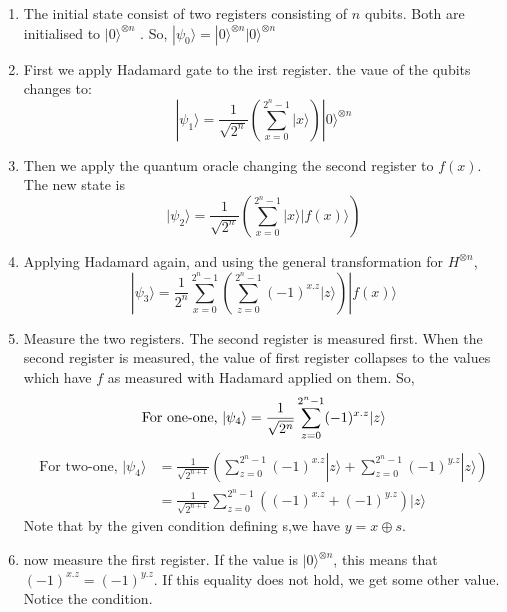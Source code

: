 \begin{enumerate}
\item The initial state consist of two registers consisting of $n$ qubits. Both are initialised to $|0\rangle^{\otimes n}$ . So, $|\psi_0\rangle = |0\rangle^{\otimes n}|0\rangle^{\otimes n}$
\item First we apply Hadamard gate to the irst register. the vaue of the qubits changes to:\begin{equation}
|\psi_1\rangle = \frac{1}{\sqrt{2^{n}}}\left( \sum_{x=0}^{2^n -1} |x\rangle \right)|0\rangle^{\otimes n} 
\end{equation}
\item Then we apply the quantum oracle changing the second register to $f(x)$. The new state is \begin{equation}
|\psi_2\rangle = \frac{1}{\sqrt{2^{n}}}\left( \sum_{x=0}^{2^n -1} |x\rangle |f(x)\rangle\right)
\end{equation}
\item Applying Hadamard again, and using the general transformation for $H^{\otimes n}$,\begin{equation}
|\psi_3\rangle = \frac{1}{2^{n}} \sum_{x=0}^{2^n -1} \left(\sum_{z=0}^{2^n -1} (-1)^{x.z} |z\rangle\right)|f(x)\rangle
\end{equation}
\item Measure the two registers. The second register is measured first. When the second register is measured, the value of first register collapses to the values which have $f$ as measured with Hadamard applied on them. So, \begin{equation}
\text{For one-one, } |\psi_4\rangle =  \frac{1}{\sqrt{2^{n}}} \sum_{z=0}^{2^n -1} (-1)^{x.z} |z\rangle \\
\end{equation}\begin{equation}
\begin{split}
\text{For two-one, } |\psi_4\rangle & =  \frac{1}{\sqrt{2^{n+1}}}\left( \sum_{z=0}^{2^n -1} (-1)^{x.z} |z\rangle + \sum_{z=0}^{2^n -1} (-1)^{y.z} |z\rangle\right) \\ & = \frac{1}{\sqrt{2^{n+1}}} \sum_{z=0}^{2^n -1}\left( (-1)^{x.z} + (-1)^{y.z}\right)|z\rangle
\end{split}
\end{equation}Note that by the given condition defining s,we have $y = x \oplus s$.
\item now measure the first register. If the value is $|0\rangle^{\otimes n}$, this means that $(-1)^{x.z} = (-1)^{y.z}$. If this equality does not hold, we get some other value. Notice the condition. \begin{equation}

\end{equation}
\end{enumerate}
